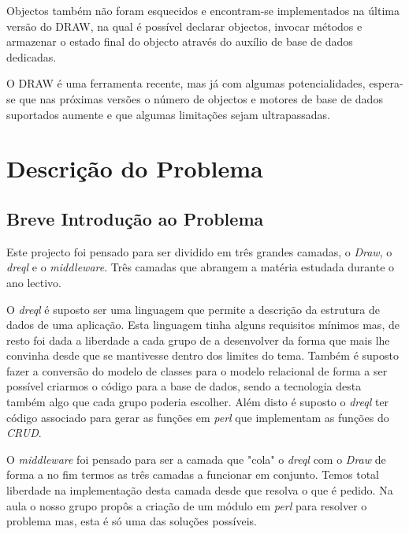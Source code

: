 \documentclass[a4paper]{article}
\begin{document}
\hspace{1cm}Objectos também não foram esquecidos e encontram-se implementados na última versão do DRAW, na qual é possível declarar objectos, invocar métodos e
armazenar o estado final do objecto através do auxílio de base de dados dedicadas.

\hspace{1cm}O DRAW é uma ferramenta recente, mas já com algumas potencialidades, espera-se que nas próximas versões o número de objectos e motores de base de dados
suportados aumente e que algumas limitações sejam ultrapassadas.

\newpage
\section{\LARGE Descrição do Problema}

\subsection{\large Breve Introdução ao Problema}

\hspace{1cm}Este projecto foi pensado para ser dividido em três grandes camadas, o {\em Draw}, o {\em dreql} e o {\em middleware}. Três camadas que abrangem a matéria estudada durante o ano lectivo.

\hspace{1cm}O {\em dreql} é suposto ser uma linguagem que permite a descrição da estrutura de dados de uma aplicação. Esta linguagem tinha alguns requisitos mínimos mas, de resto foi dada a liberdade a cada grupo de a desenvolver da forma que mais lhe convinha desde que se mantivesse dentro dos limites do tema. Também é suposto fazer a conversão do modelo de classes para o modelo relacional de forma a ser possível criarmos o código para a base de dados, sendo a tecnologia desta também algo que cada grupo poderia escolher. Além disto é suposto o {\em dreql} ter código associado para gerar as funções em {\em perl} que implementam as funções do {\em CRUD}.

\hspace{1cm}O {\em middleware} foi pensado para ser a camada que "cola" o {\em dreql} com o {\em Draw} de forma a no fim termos as três camadas a funcionar em conjunto. Temos total liberdade na implementação desta camada desde que resolva o que é pedido. Na aula o nosso grupo propôs a criação de um módulo em {\em perl} para resolver o problema mas, esta é só uma das soluções possíveis.
\end{document}
